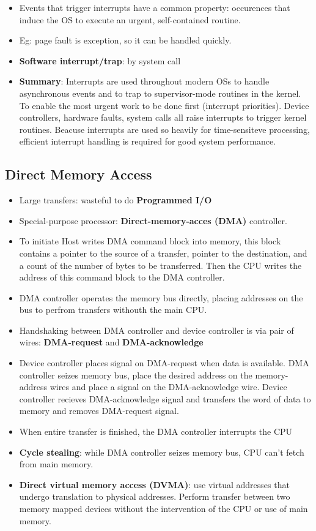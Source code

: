 \documentclass[10pt]{report}
\begin{document}
\begin{itemize}
				\item Events that trigger interrupts have a common property: occurences that induce the OS to execute an urgent, self-contained routine.
				\item Eg: page fault is exception, so it can be handled quickly.
				\item \textbf{Software interrupt/trap}: by system call
				\item \textbf{Summary}: Interrupts are used throughout modern OSs to handle asynchronous events and to trap to supervisor-mode routines in the kernel. To enable the most urgent work to be done first (interrupt priorities). Device controllers, hardware faults, system calls all raise interrupts to trigger kernel routines. Beacuse interrupts are used so heavily for time-sensiteve processing, efficient interrupt handling is required for good system performance.
			\end{itemize}

		\subsection{Direct Memory Access}
			\begin{itemize}
				\item Large transfers: wasteful to do \textbf{Programmed I/O}
				\item Special-purpose processor: \textbf{Direct-memory-acces (DMA)} controller.
				\item To initiate Host writes DMA command block into memory, this block contains a pointer to the source of a transfer, pointer to the destination, and a count of the number of bytes to be transferred. Then the CPU writes the address of this command block to the DMA controller.
				\item DMA controller operates the memory bus directly, placing addresses on the bus to perfrom transfers withouth the main CPU.
				\item Handshaking between DMA controller and device controller is via pair of wires: \textbf{DMA-request} and \textbf{DMA-acknowledge}
				\item Device controller places signal on DMA-request when data is available. DMA controller seizes memory bus, place the desired address on the memory-address wires and place a signal on the DMA-acknowledge wire. Device controller recieves DMA-acknowledge signal and transfers the word of data to memory and removes DMA-request signal.
				\item When entire transfer is finished, the DMA controller interrupts the CPU
				\item \textbf{Cycle stealing}: while DMA controller seizes memory bus, CPU can't fetch from main memory.
				\item \textbf{Direct virtual memory access (DVMA)}: use virtual addresses that undergo translation to physical addresses. Perform transfer between two memory mapped devices without the intervention of the CPU or use of main memory.
			\end{itemize}
\end{document}
